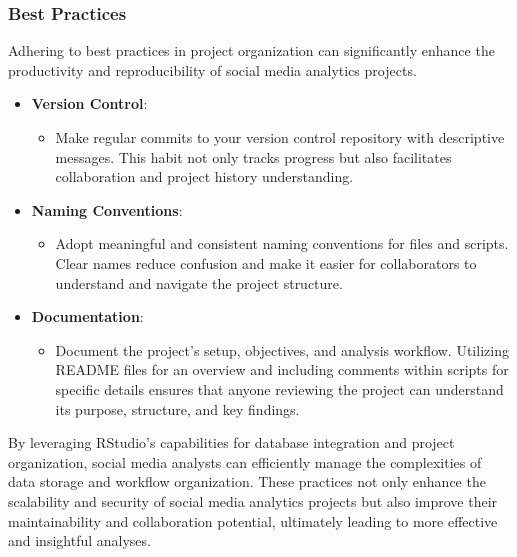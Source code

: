 \documentclass[
]{book}
\providecommand{\tightlist}{%
  \setlength{\itemsep}{0pt}\setlength{\parskip}{0pt}}
\begin{document}
\hypertarget{best-practices}{%
\subsubsection{Best Practices}\label{best-practices}}

Adhering to best practices in project organization can significantly enhance the productivity and reproducibility of social media analytics projects.

\begin{itemize}
\tightlist
\item
  \textbf{Version Control}:

  \begin{itemize}
  \tightlist
  \item
    Make regular commits to your version control repository with descriptive messages. This habit not only tracks progress but also facilitates collaboration and project history understanding.
  \end{itemize}
\item
  \textbf{Naming Conventions}:

  \begin{itemize}
  \tightlist
  \item
    Adopt meaningful and consistent naming conventions for files and scripts. Clear names reduce confusion and make it easier for collaborators to understand and navigate the project structure.
  \end{itemize}
\item
  \textbf{Documentation}:

  \begin{itemize}
  \tightlist
  \item
    Document the project's setup, objectives, and analysis workflow. Utilizing README files for an overview and including comments within scripts for specific details ensures that anyone reviewing the project can understand its purpose, structure, and key findings.
  \end{itemize}
\end{itemize}

By leveraging RStudio's capabilities for database integration and project organization, social media analysts can efficiently manage the complexities of data storage and workflow organization. These practices not only enhance the scalability and security of social media analytics projects but also improve their maintainability and collaboration potential, ultimately leading to more effective and insightful analyses.
\end{document}
